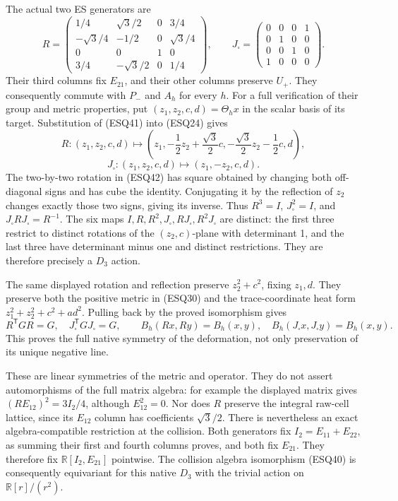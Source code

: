 \documentclass[
  10pt,
  a4paper,
]{article}
\begin{document}
The actual two ES generators are \[
R=\begin{pmatrix}
1/4&\sqrt3/2&0&3/4\\
-\sqrt3/4&-1/2&0&\sqrt3/4\\
0&0&1&0\\
3/4&-\sqrt3/2&0&1/4
\end{pmatrix},\qquad
J_\square=\begin{pmatrix}
0&0&0&1\\0&1&0&0\\0&0&1&0\\1&0&0&0
\end{pmatrix}.
\tag{ESQ41}
\] Their third columns fix \(E_{21}\), and their other columns preserve
\(U_+\). They consequently commute with \(P_-\) and \(A_h\) for every
\(h\). For a full verification of their group and metric properties, put
\((z_1,z_2,c,d)=\Theta_hx\) in the scalar basis of its target.
Substitution of (ESQ41) into (ESQ24) gives \[
R:(z_1,z_2,c,d)\longmapsto
\left(z_1,-\frac12z_2+\frac{\sqrt3}{2}c,
-\frac{\sqrt3}{2}z_2-\frac12c,d\right),
\tag{ESQ42}
\] \[
J_\square:(z_1,z_2,c,d)\longmapsto(z_1,-z_2,c,d).
\tag{ESQ43}
\] The two-by-two rotation in (ESQ42) has square obtained by changing
both off-diagonal signs and has cube the identity. Conjugating it by the
reflection of \(z_2\) changes exactly those two signs, giving its
inverse. Thus \(R^3=I\), \(J_\square^2=I\), and
\(J_\square RJ_\square=R^{-1}\). The six maps
\(I,R,R^2,J_\square,RJ_\square,R^2J_\square\) are distinct: the first
three restrict to distinct rotations of the \((z_2,c)\)-plane with
determinant 1, and the last three have determinant minus one and
distinct restrictions. They are therefore precisely a \(D_3\) action.

The same displayed rotation and reflection preserve \(z_2^2+c^2\),
fixing \(z_1,d\). They preserve both the positive metric in (ESQ30) and
the trace-coordinate heat form \(z_1^2+z_2^2+c^2+a d^2\). Pulling back
by the proved isomorphism gives \[
R^{\mathsf T}GR=G,\quad J_\square^{\mathsf T}GJ_\square=G,
\qquad
B_h(Rx,Ry)=B_h(x,y),\quad
B_h(J_\square x,J_\square y)=B_h(x,y).
\tag{ESQ44}
\] This proves the full native symmetry of the deformation, not only
preservation of its unique negative line.

These are linear symmetries of the metric and operator. They do not
assert automorphisms of the full matrix algebra: for example the
displayed matrix gives \((R E_{12})^2=3I_2/4\), although \(E_{12}^2=0\).
Nor does \(R\) preserve the integral raw-cell lattice, since its
\(E_{12}\) column has coefficients \(\sqrt3/2\). There is nevertheless
an exact algebra-compatible restriction at the collision. Both
generators fix \(I_2=E_{11}+E_{22}\), as summing their first and fourth
columns proves, and both fix \(E_{21}\). They therefore fix
\(\mathbb R[I_2,E_{21}]\) pointwise. The collision algebra isomorphism
(ESQ40) is consequently equivariant for this native \(D_3\) with the
trivial action on \(\mathbb R[r]/(r^2)\).
\end{document}
